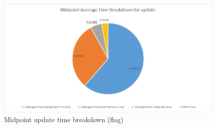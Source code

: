     \begin{figure}
    \begin{center}
      \includegraphics[scale=.9]{Figures/flag_m_ut}
    \end{center}
    \caption{Midpoint update time breakdown (flag)}
    \label{fig:m ut flag}
  \end{figure}

